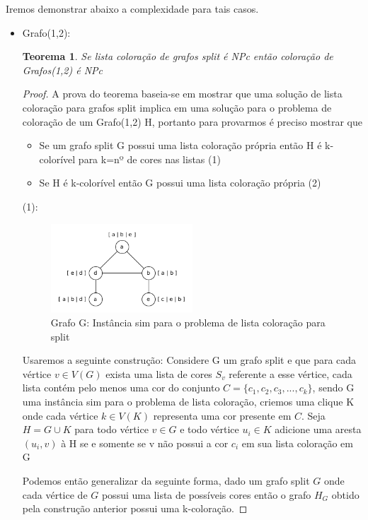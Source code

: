 \documentclass[
	12pt,				%
	openright,			%
	oneside,			%
	a4paper,			%
	english,			%
	french,				%
	spanish,			%
	brazil				%
	]{abntex2}
\newtheorem{teorema}{Teorema}
\begin{document}
Iremos demonstrar abaixo a complexidade para tais casos. 
\begin{itemize}
  \item Grafo(1,2):
    \begin{teorema}
      Se lista coloração de grafos split é NPc então coloração de Grafos(1,2) é NPc
    \end{teorema}
    \begin{proof}
      A prova do teorema baseia-se em mostrar que uma solução de lista coloração para grafos split implica em uma solução para o problema de coloração de um Grafo(1,2) H, portanto para provarmos é preciso mostrar que
      \begin{itemize}
        \item Se um grafo split G possui uma lista coloração própria então H é k-colorível para k=nº de cores nas listas (1)
        \item Se H é k-colorível então G possui uma lista coloração própria (2)
      \end{itemize}
      (1):\newline
      \begin{figure}[!ht]
        \centering
        \includegraphics[width=0.5\textwidth]{split-1.png}
        \caption{Grafo G: Instância sim para o problema de lista coloração para split }
      \end{figure}
      Usaremos a seguinte construção:\newline
      Considere G um grafo split e que para cada vértice $v \in V(G)$ exista uma lista de cores $S_v$ referente a esse vértice, cada lista contém pelo menos uma cor do conjunto $C = \{c_1,c_2,c_3,...,c_k \}$, sendo G uma instância sim para o problema de lista coloração, criemos uma clique K onde cada vértice $k \in V(K)$ representa uma cor presente em $C$. Seja $H = G \cup K$ para todo vértice $v \in G$ e todo vértice $u_i \in K$ adicione uma aresta $(u_i,v)$ à H se e somente se v não possui a cor $c_i$ em sua lista coloração em G
      
      Podemos então generalizar da seguinte forma, dado um grafo split $G$ onde cada vértice de $G$ possui uma lista de possíveis cores então o grafo $H_G$ obtido pela construção anterior possui uma k-coloração.
      

\end{proof}
\end{itemize}
\end{document}
